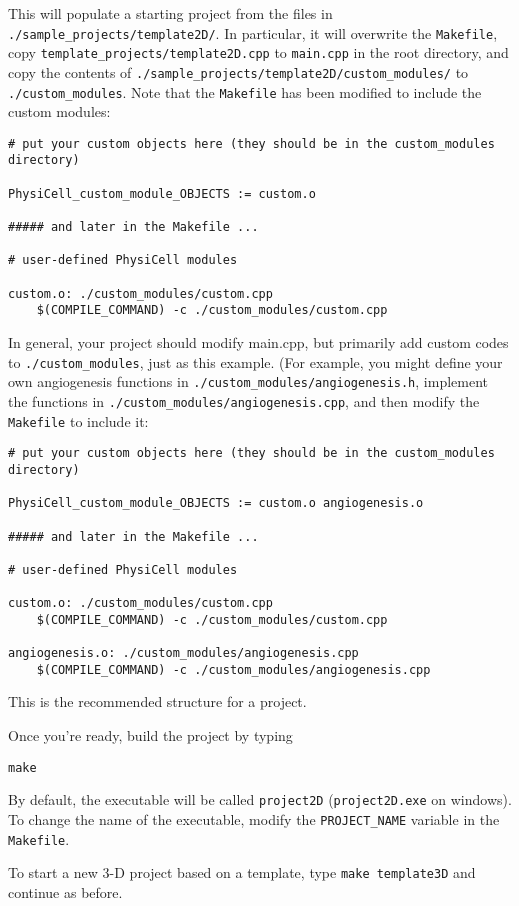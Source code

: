 \documentclass[12pt]{article}
\renewcommand{\v}{\verb}
\begin{document}
This will populate a starting project from the files in \v|./sample_projects/template2D/|. In particular, 
it will overwrite the \v|Makefile|, copy \v|template_projects/template2D.cpp| to \v|main.cpp| in the root directory, 
and copy the contents of \v|./sample_projects/template2D/custom_modules/| to \v|./custom_modules|. 
Note that the \v|Makefile| has been modified to include the custom modules: 
\begin{verbatim}
# put your custom objects here (they should be in the custom_modules directory)

PhysiCell_custom_module_OBJECTS := custom.o

##### and later in the Makefile ... 

# user-defined PhysiCell modules

custom.o: ./custom_modules/custom.cpp 
    $(COMPILE_COMMAND) -c ./custom_modules/custom.cpp
\end{verbatim}
In general, your project should modify main.cpp, but primarily add custom codes to 
\v|./custom_modules|, just as this example. (For example, you might define your own
angiogenesis functions in \break 
\v|./custom_modules/angiogenesis.h|, implement the functions 
in \v|./custom_modules/angiogenesis.cpp|, and then modify the \v|Makefile| to include 
it:
\begin{verbatim}
# put your custom objects here (they should be in the custom_modules directory)

PhysiCell_custom_module_OBJECTS := custom.o angiogenesis.o

##### and later in the Makefile ... 

# user-defined PhysiCell modules

custom.o: ./custom_modules/custom.cpp 
    $(COMPILE_COMMAND) -c ./custom_modules/custom.cpp

angiogenesis.o: ./custom_modules/angiogenesis.cpp 
    $(COMPILE_COMMAND) -c ./custom_modules/angiogenesis.cpp
\end{verbatim}
This is the recommended structure for a project. 

Once you're ready, build the project by typing 

\v|make|

By default, the executable will be called \v|project2D| (\v|project2D.exe| on windows). To 
change the name of the executable, modify the \v|PROJECT_NAME| variable in the \v|Makefile|. 

To start a new 3-D project based on a template, type \v|make template3D| and continue as before. 
\end{document}
